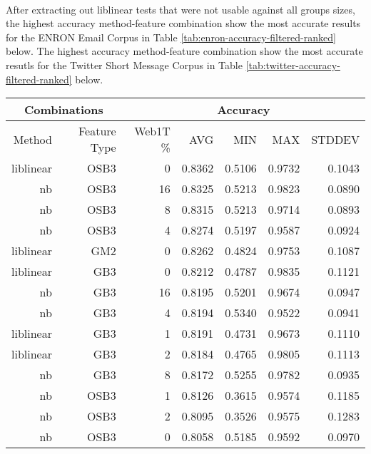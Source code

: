 	\paragraph*{} After extracting out liblinear tests that were not usable against all groups sizes, the highest accuracy method-feature combination show the most accurate results for the ENRON Email Corpus in Table \ref{tab:enron-accuracy-filtered-ranked} below.  The highest accuracy method-feature combination show the most accurate resutls for the Twitter Short Message Corpus in Table \ref{tab:twitter-accuracy-filtered-ranked} below.
	
	\begin{center}
	\begin{table}[h]

			\begin{tabular}{ | r | r | r | r | r | r | r | }
			\hline
			\multicolumn{2}{|c|}{Combinations} & \multicolumn{5}{|c|}{Accuracy}\\
			\hline
			Method & Feature Type & Web1T \% & AVG & MIN & MAX & STDDEV\\ \hline 
			liblinear & OSB3 & 0 & 0.8362 & 0.5106 & 0.9732 & 0.1043\\ \hline 
			nb & OSB3 & 16 & 0.8325 & 0.5213 & 0.9823 & 0.0890\\ \hline 
			nb & OSB3 & 8 & 0.8315 & 0.5213 & 0.9714 & 0.0893\\ \hline 
			nb & OSB3 & 4 & 0.8274 & 0.5197 & 0.9587 & 0.0924\\ \hline 
			liblinear & GM2 & 0 & 0.8262 & 0.4824 & 0.9753 & 0.1087\\ \hline 
			liblinear & GB3 & 0 & 0.8212 & 0.4787 & 0.9835 & 0.1121\\ \hline 
			nb & GB3 & 16 & 0.8195 & 0.5201 & 0.9674 & 0.0947\\ \hline 
			nb & GB3 & 4 & 0.8194 & 0.5340 & 0.9522 & 0.0941\\ \hline 
			liblinear & GB3 & 1 & 0.8191 & 0.4731 & 0.9673 & 0.1110\\ \hline 
			liblinear & GB3 & 2 & 0.8184 & 0.4765 & 0.9805 & 0.1113\\ \hline 
			nb & GB3 & 8 & 0.8172 & 0.5255 & 0.9782 & 0.0935\\ \hline 
			nb & OSB3 & 1 & 0.8126 & 0.3615 & 0.9574 & 0.1185\\ \hline 
			nb & OSB3 & 2 & 0.8095 & 0.3526 & 0.9575 & 0.1283\\ \hline 
			nb & OSB3 & 0 & 0.8058 & 0.5185 & 0.9592 & 0.0970\\ \hline 

\end{tabular}
\end{table}
\end{center}
